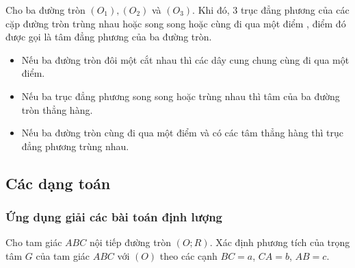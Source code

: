 \begin{dl}
	Cho ba đường tròn $\left(O_1\right), \left(O_2\right)$ và $\left(O_3\right)$. Khi đó, $3$ trục đẳng phương của các cặp đường tròn trùng nhau hoặc song song hoặc cùng đi qua một điểm , điểm đó được gọi là tâm đẳng phương của ba đường tròn.
\end{dl}
\begin{itemize}
	\item Nếu ba đường tròn đôi một cắt nhau thì các dây cung chung cùng đi qua một điểm.
	\item Nếu ba trục đẳng phương song song hoặc trùng nhau thì tâm của ba đường tròn thẳng hàng.
	\item Nếu ba đường tròn cùng đi qua một điểm và có các tâm thẳng hàng thì trục đẳng phương trùng nhau.
\end{itemize}

\subsection{Các dạng toán}

\subsubsection{Ứng dụng giải các bài toán định lượng}
\begin{bt}
	Cho tam giác $ABC$ nội tiếp đường tròn $(O; R)$. Xác định phương tích của trọng tâm $G$ của tam giác $ABC$ với $(O)$ theo các cạnh $BC = a$, $CA = b$, $AB = c$.
\end{bt}

